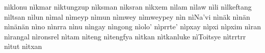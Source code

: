 \documentclass[a4paper]{article}
\begin{document}
nìklonu\hspace{2mm}
nìkmar\hspace{2mm}
nìktungzup\hspace{2mm}
nìksman\hspace{2mm}
nìksran\hspace{2mm}
nìkxem\hspace{2mm}
nìlam\hspace{2mm}
nìlaw\hspace{2mm}
nìli\hspace{2mm}
nìlkeftang\hspace{2mm}
nìltsan\hspace{2mm}
nìlun\hspace{2mm}
nìmal\hspace{2mm}
nìmeyp\hspace{2mm}
nìmun\hspace{2mm}
nìmwey\hspace{2mm}
nìmweypey\hspace{2mm}
nìn\hspace{2mm}
nìNa'vi\hspace{2mm}
nìnäk\hspace{2mm}
nìnän\hspace{2mm}
nìnänän\hspace{2mm}
nìno\hspace{2mm}
nìnrra\hspace{2mm}
nìnu\hspace{2mm}
nìngay\hspace{2mm}
nìngong\hspace{2mm}
nìolo'\hspace{2mm}
nìprrte'\hspace{2mm}
nìpxay\hspace{2mm}
nìpxi\hspace{2mm}
nìpxim\hspace{2mm}
nìran\hspace{2mm}
nìrangal\hspace{2mm}
nìronsrel\hspace{2mm}
nìtam\hspace{2mm}
nìteng\hspace{2mm}
nìtengfya\hspace{2mm}
nìtkan\hspace{2mm}
nìtkanluke\hspace{2mm}
nìToitsye\hspace{2mm}
nìtrrtrr\hspace{2mm}
nìtut\hspace{2mm}
nìtxan\hspace{2mm}
\end{document}
